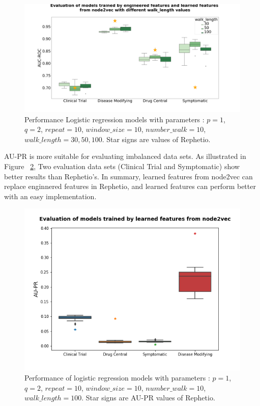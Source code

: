 \begin{figure}[!h]
    \centering
    \includegraphics[scale=0.2]
    {figures/wl.png}
    \captionsetup{justification=centering}
    \caption[Evaluation of different walk\_length in node2vec]{\label{fig:wl}Performance Logistic regression models with parameters : $p = 1$, $q = 2$, $repeat = 10$, $window\_size = 10$, $number\_walk = 10$, $walk\_length = 30, 50, 100$. Star signs are values of Rephetio.
}
\end{figure}

AU-PR is more suitable for evaluating imbalanced data sets. As illustrated in Figure ~\ref{fig:node2vec_pr}, Two evaluation data sets (Clinical Trial and Symptomatic) show better results than Rephetio's.  In summary, learned features from node2vec can replace enginnered features in Rephetio, and learned features can perform better with an easy implementation. 

\begin{figure}[!h]
    \centering
    \includegraphics[scale=0.65]
    {figures/node2vec_pr.png}
    \captionsetup{justification=centering}
    \caption[AU-PRs of logistic regression models trained by learned features from node2vec]{\label{fig:node2vec_pr}Performance of logistic regression models with parameters : $p = 1$, $q = 2$, $repeat = 10$, $window\_size = 10$, $number\_walk = 10$, $walk\_length = 100$. Star signs are \ac{AU-PR} values of Rephetio.
}
\end{figure}

